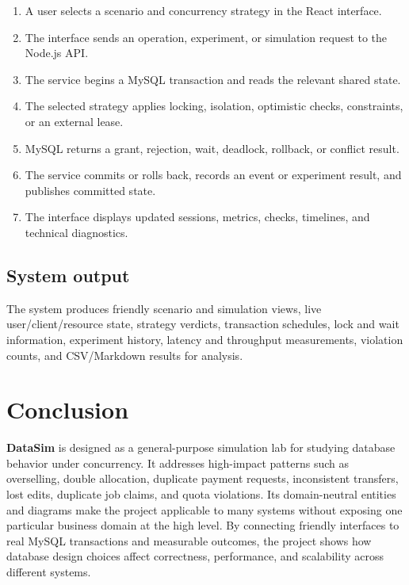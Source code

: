 \documentclass[12pt,a4paper]{article}
\newcommand{\datasim}{\textbf{DataSim}}
\begin{document}
\begin{enumerate}
\item A user selects a scenario and concurrency strategy in the React interface.
\item The interface sends an operation, experiment, or simulation request to the Node.js API.
\item The service begins a MySQL transaction and reads the relevant shared state.
\item The selected strategy applies locking, isolation, optimistic checks, constraints, or an external lease.
\item MySQL returns a grant, rejection, wait, deadlock, rollback, or conflict result.
\item The service commits or rolls back, records an event or experiment result, and publishes committed state.
\item The interface displays updated sessions, metrics, checks, timelines, and technical diagnostics.
\end{enumerate}

\subsection{System output}

The system produces friendly scenario and simulation views, live user/client/resource state, strategy verdicts, transaction schedules, lock and wait information, experiment history, latency and throughput measurements, violation counts, and CSV/Markdown results for analysis.

\section*{Conclusion}

\datasim{} is designed as a general-purpose simulation lab for studying database behavior under concurrency. It addresses high-impact patterns such as overselling, double allocation, duplicate payment requests, inconsistent transfers, lost edits, duplicate job claims, and quota violations. Its domain-neutral entities and diagrams make the project applicable to many systems without exposing one particular business domain at the high level. By connecting friendly interfaces to real MySQL transactions and measurable outcomes, the project shows how database design choices affect correctness, performance, and scalability across different systems.
\end{document}
